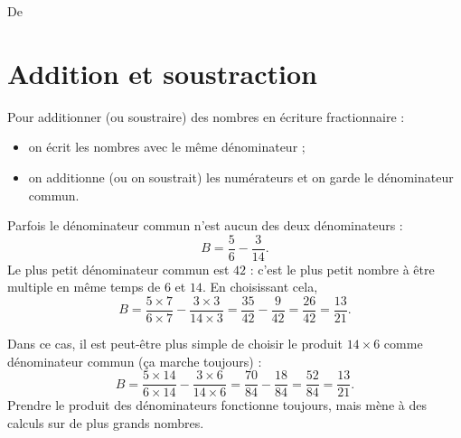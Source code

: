 

De \cite{NRHooXFvgpp4}

\section{Addition et soustraction}

\begin{Aretenir}
    Pour additionner (ou soustraire) des nombres en écriture fractionnaire :
    \begin{itemize}
        \item 
            on écrit les nombres avec le même dénominateur ;
        \item 
            on additionne (ou on soustrait) les numérateurs et on garde le dénominateur commun.
    \end{itemize}
\end{Aretenir}

\begin{example}
    Parfois le dénominateur commun n'est aucun des deux dénominateurs :
    \begin{equation}
        B=\frac{5}{ 6 }-\frac{ 3 }{ 14 }.
    \end{equation}
    Le plus petit dénominateur commun est \( 42\) : c'est le plus petit nombre à être multiple en même temps de \( 6\) et \( 14\). En choisissant cela,
    \begin{equation}
        B=\frac{ 5\times 7 }{ 6\times 7 }-\frac{ 3\times 3 }{ 14\times 3 }=\frac{ 35 }{ 42 }-\frac{ 9 }{ 42 }=\frac{ 26 }{ 42 }=\frac{ 13 }{ 21 }.
    \end{equation}
    
    Dans ce cas, il est peut-être plus simple de choisir le produit \( 14\times 6\) comme dénominateur commun (ça marche toujours) :
    \begin{equation}
        B=\frac{ 5\times 14 }{ 6\times 14 }-\frac{ 3\times 6 }{ 14\times 6 }=\frac{ 70 }{ 84 }-\frac{ 18 }{ 84 }=\frac{ 52 }{ 84 }=\frac{ 13 }{ 21 }.
    \end{equation}
    Prendre le produit des dénominateurs fonctionne toujours, mais mène à des calculs sur de plus grands nombres.    
\end{example}

